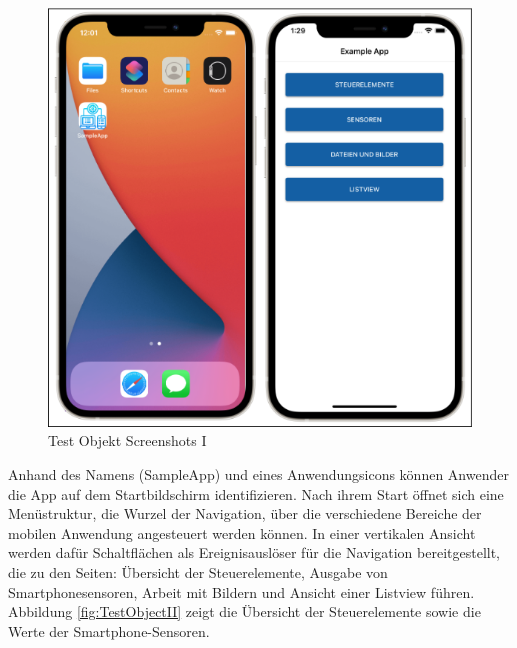 \begin{figure}[!ht]
 \includegraphics[width=\textwidth,keepaspectratio]{Images/Screenshot/AppIconAndMenu.png}
 \caption{Test Objekt Screenshots I}
 \label{fig:TestObjectI}
\end{figure}

Anhand des Namens (SampleApp) und eines Anwendungsicons können Anwender die App auf dem Startbildschirm identifizieren.  Nach ihrem Start öffnet sich eine Menüstruktur,  die Wurzel der Navigation, über die verschiedene Bereiche der mobilen Anwendung angesteuert werden können.  In einer vertikalen Ansicht werden dafür Schaltflächen als Ereignisauslöser für die Navigation bereitgestellt,  die zu den Seiten: \glq Übersicht der Steuerelemente\grq ,  \glq Ausgabe von Smartphonesensoren\grq ,  \glq Arbeit mit Bildern\grq{}  und \glq Ansicht einer Listview\grq{}  führen.  
Abbildung \ref{fig:TestObjectII} zeigt die Übersicht der Steuerelemente sowie die Werte der Smartphone-Sensoren.

